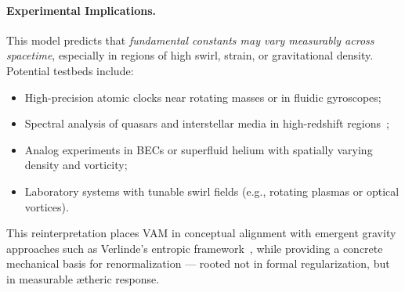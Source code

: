 \vspace{0.5em}

\paragraph{Experimental Implications.}
This model predicts that \emph{fundamental constants may vary measurably across spacetime}, especially in regions of high swirl, strain, or gravitational density. Potential testbeds include:
\begin{itemize}
    \item High-precision atomic clocks near rotating masses or in fluidic gyroscopes;
    \item Spectral analysis of quasars and interstellar media in high-redshift regions~\cite{shapiro2004variation, uzan2011varying};
    \item Analog experiments in BECs or superfluid helium with spatially varying density and vorticity;
    \item Laboratory systems with tunable swirl fields (e.g., rotating plasmas or optical vortices).
\end{itemize}

\vspace{0.5em}

This reinterpretation places VAM in conceptual alignment with emergent gravity approaches such as Verlinde’s entropic framework~\cite{verlinde2016emergent}, while providing a concrete mechanical basis for renormalization — rooted not in formal regularization, but in measurable ætheric response.


